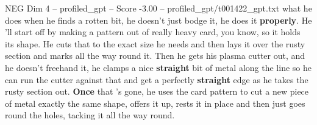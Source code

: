 \begin{textsample}{NEG Dim 4 – profiled\_gpt – Score -3.00 – profiled\_gpt/t001422\_gpt.txt}  \label{ex:f4_neg_006}
what he does when he finds a rotten bit, he doesn't just bodge it, he does it \textbf{properly}.
He ’ll start off by making a pattern out of really heavy card, you know, so it holds its shape.
He cuts that to the exact size he needs and then lays it over the rusty section and marks all the way round it.
Then he gets his plasma cutter out, and he doesn't freehand it, he clamps a nice \textbf{straight} bit of metal along the line so he can run the cutter against that and get a perfectly \textbf{straight} edge as he takes the rusty section out. \textbf{Once} that ’s gone, he uses the card pattern to cut a new piece of metal exactly the same shape, offers it up, rests it in place and then just goes round the holes, tacking it all the way round.

\end{textsample}
